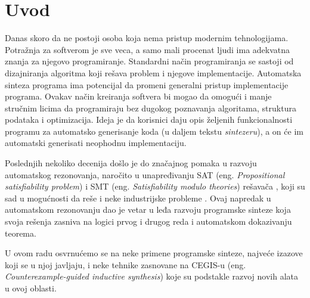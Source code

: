 \section{Uvod}
\label{sec:uvod}

Danas skoro da ne postoji osoba koja nema pristup modernim tehnologijama. Potražnja za softverom je sve veca, a samo mali procenat ljudi ima adekvatna
znanja za njegovo programiranje. Standardni način programiranja se sastoji od dizajniranja algoritma koji rešava problem i njegove implementacije. Automatska sinteza programa ima potencijal da promeni generalni pristup implementacije programa. Ovakav način kreiranja softvera bi mogao da omogući i manje stručnim licima da programiraju bez dugokog poznavanja algoritama, struktura podataka i optimizacija.
Ideja je da korisnici daju opis željenih funkcionalnosti programu za automatsko generisanje koda (u daljem tekstu \emph{sintezeru}), a on će im automatski generisati neophodnu implementaciju.

Poslednjih nekoliko decenija došlo je do značajnog pomaka u razvoju automatskog rezonovanja, naročito u unapređivanju SAT (eng. \emph{Propositional satisfiability problem}) i SMT (eng. \emph{Satisfiability modulo theories}) rešavača \cite{SMT}, koji su sad u mogućnosti da reše i neke industrijske probleme \cite{PSE}. Ovaj napredak u automatskom rezonovanju dao je vetar u leđa razvoju programske sinteze koja svoja rešenja zasniva na logici prvog i drugog reda i automatskom dokazivanju teorema.

U ovom radu osvrnućemo se na neke primene programske sinteze, najveće izazove koji se u njoj javljaju, i neke tehnike zasnovane na CEGIS-u (eng. \emph{Counterexample-guided inductive synthesis}) koje su podstakle razvoj novih alata u ovoj oblasti.
